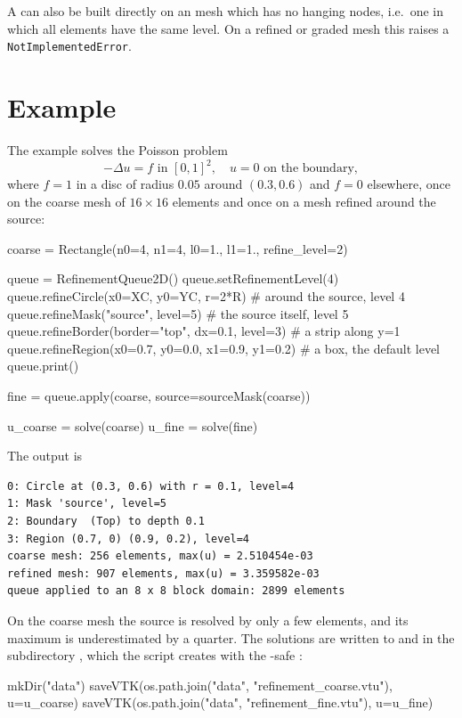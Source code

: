 A \LinearPDE can also be built directly on an \oxley mesh which has no hanging
nodes, i.e.\ one in which all elements have the same level. On a refined or
graded mesh this raises a \texttt{NotImplementedError}.

\section{Example}\label{sec:oxley:example}
The example  solves the Poisson problem
\begin{equation}
-\Delta u = f \mbox{ in } [0,1]^2, \quad u = 0 \mbox{ on the boundary},
\end{equation}
where $f=1$ in a disc of radius $0.05$ around $(0.3,0.6)$ and $f=0$ elsewhere,
once on the coarse mesh of $16 \times 16$ elements and once on a mesh refined
around the source:
\begin{python}
coarse = Rectangle(n0=4, n1=4, l0=1., l1=1., refine_level=2)

queue = RefinementQueue2D()
queue.setRefinementLevel(4)
queue.refineCircle(x0=XC, y0=YC, r=2*R)             # around the source, level 4
queue.refineMask("source", level=5)                 # the source itself, level 5
queue.refineBorder(border="top", dx=0.1, level=3)   # a strip along y=1
queue.refineRegion(x0=0.7, y0=0.0, x1=0.9, y1=0.2)  # a box, the default level
queue.print()

fine = queue.apply(coarse, source=sourceMask(coarse))

u_coarse = solve(coarse)
u_fine = solve(fine)
\end{python}
The output is
\begin{verbatim}
0: Circle at (0.3, 0.6) with r = 0.1, level=4
1: Mask 'source', level=5
2: Boundary  (Top) to depth 0.1
3: Region (0.7, 0) (0.9, 0.2), level=4
coarse mesh: 256 elements, max(u) = 2.510454e-03
refined mesh: 907 elements, max(u) = 3.359582e-03
queue applied to an 8 x 8 block domain: 2899 elements
\end{verbatim}
On the coarse mesh the source is resolved by only a few elements, and its
maximum is underestimated by a quarter. The solutions are written to
 and  in the
subdirectory , which the script creates with the \MPI-safe
:
\begin{python}
mkDir("data")
saveVTK(os.path.join("data", "refinement_coarse.vtu"), u=u_coarse)
saveVTK(os.path.join("data", "refinement_fine.vtu"), u=u_fine)
\end{python}

